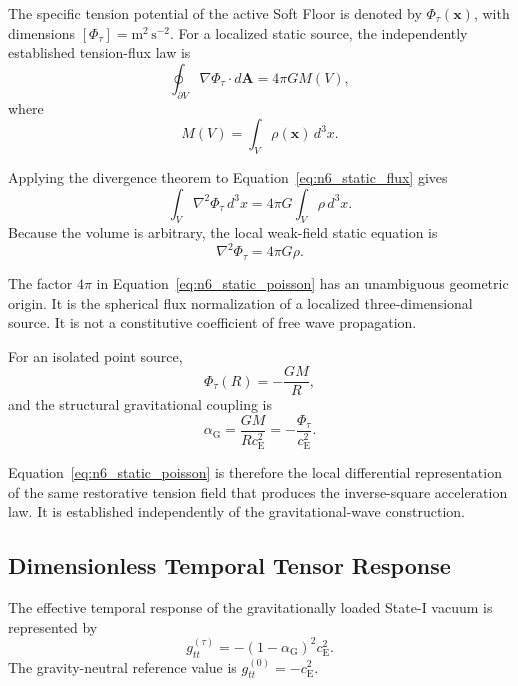 The specific tension potential of the active Soft Floor is denoted by $\Phi_{\tau}(\mathbf{x})$, with dimensions $[\Phi_{\tau}] = \mathrm{m^{2}\,s^{-2}}$. For a localized static source, the independently established tension-flux law is
\begin{equation}
    \oint_{\partial V} \nabla\Phi_{\tau} \cdot d\mathbf{A} = 4\pi G M(V),
    \label{eq:n6_static_flux}
\end{equation}
where
\begin{equation}
    M(V) = \int_{V} \rho(\mathbf{x})\,d^{3}x.
\end{equation}

Applying the divergence theorem to Equation~\eqref{eq:n6_static_flux} gives
\begin{equation}
    \int_{V} \nabla^{2}\Phi_{\tau}\,d^{3}x = 4\pi G \int_{V} \rho\,d^{3}x.
\end{equation}
Because the volume is arbitrary, the local weak-field static equation is
\begin{equation}
    \nabla^{2}\Phi_{\tau} = 4\pi G\rho.
    \label{eq:n6_static_poisson}
\end{equation}

The factor $4\pi$ in Equation~\eqref{eq:n6_static_poisson} has an unambiguous geometric origin. It is the spherical flux normalization of a localized three-dimensional source. It is not a constitutive coefficient of free wave propagation.

For an isolated point source,
\begin{equation}
    \Phi_{\tau}(R) = -\frac{GM}{R},
\end{equation}
and the structural gravitational coupling is
\begin{equation}
    \alpha_{\mathrm{G}} = \frac{GM}{Rc_{\mathrm{E}}^{2}} = -\frac{\Phi_{\tau}}{c_{\mathrm{E}}^{2}}.
    \label{eq:n6_alpha_phi_relation}
\end{equation}

Equation~\eqref{eq:n6_static_poisson} is therefore the local differential representation of the same restorative tension field that produces the inverse-square acceleration law. It is established independently of the gravitational-wave construction.

\subsection{Dimensionless Temporal Tensor Response}
\label{subsec:n6_temporal_tensor_response}

The effective temporal response of the gravitationally loaded State-I vacuum is represented by
\begin{equation}
    g_{tt}^{(\tau)} = - \left( 1-\alpha_{\mathrm{G}} \right)^{2} c_{\mathrm{E}}^{2}.
    \label{eq:n6_effective_temporal_response}
\end{equation}
The gravity-neutral reference value is $g_{tt}^{(0)} = -c_{\mathrm{E}}^{2}$.

